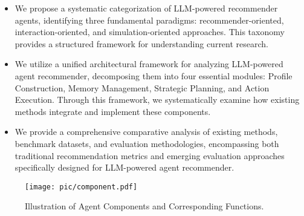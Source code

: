 \begin{itemize}
    \item We propose  a systematic categorization of LLM-powered recommender agents, identifying three fundamental paradigms: recommender-oriented, interaction-oriented, and simulation-oriented approaches. This taxonomy provides a structured framework for understanding current research.

    \item We utilize a unified architectural framework for analyzing LLM-powered agent recommender, decomposing them into four essential modules: Profile Construction, Memory Management, Strategic Planning, and Action Execution. Through this framework, we systematically examine how existing methods integrate and implement these components.

    \item We provide a comprehensive comparative analysis of existing methods, benchmark datasets, and evaluation methodologies, encompassing both traditional recommendation metrics and emerging evaluation approaches specifically designed for LLM-powered agent recommender.

\end{itemize}



\begin{figure}
    \centering
    \texttt{[image: pic/component.pdf]}
    \caption{Illustration of Agent Components and Corresponding Functions.}
    \label{component}
\end{figure}
